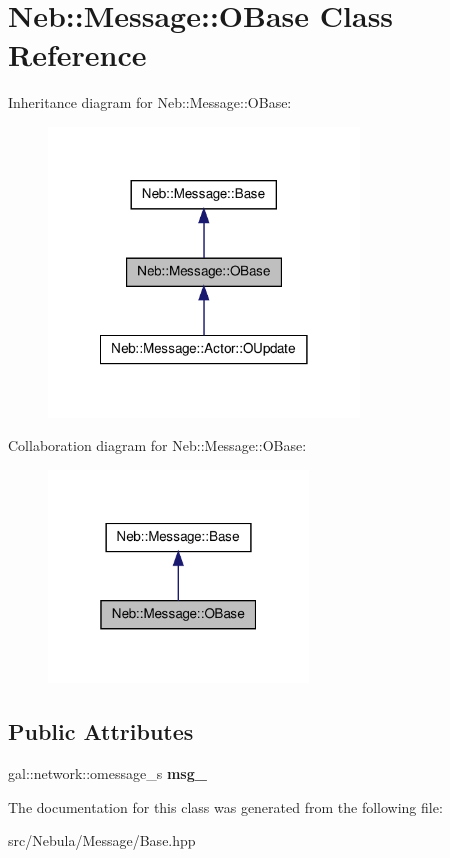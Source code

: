 \hypertarget{classNeb_1_1Message_1_1OBase}{\section{\-Neb\-:\-:\-Message\-:\-:\-O\-Base \-Class \-Reference}
\label{classNeb_1_1Message_1_1OBase}
}


\-Inheritance diagram for \-Neb\-:\-:\-Message\-:\-:\-O\-Base\-:\nopagebreak
\begin{figure}[H]
\begin{center}
\leavevmode
\includegraphics[width=234pt]{classNeb_1_1Message_1_1OBase__inherit__graph}
\end{center}
\end{figure}


\-Collaboration diagram for \-Neb\-:\-:\-Message\-:\-:\-O\-Base\-:\nopagebreak
\begin{figure}[H]
\begin{center}
\leavevmode
\includegraphics[width=196pt]{classNeb_1_1Message_1_1OBase__coll__graph}
\end{center}
\end{figure}
\subsection*{\-Public \-Attributes}
\begin{DoxyCompactItemize}
\item 
\hypertarget{classNeb_1_1Message_1_1OBase_a1c931edd23c75b30ee0c328e375dd67d}{gal\-::network\-::omessage\-\_\-s {\bfseries msg\-\_\-}}\label{classNeb_1_1Message_1_1OBase_a1c931edd23c75b30ee0c328e375dd67d}

\end{DoxyCompactItemize}


\-The documentation for this class was generated from the following file\-:\begin{DoxyCompactItemize}
\item 
src/\-Nebula/\-Message/\-Base.\-hpp\end{DoxyCompactItemize}
